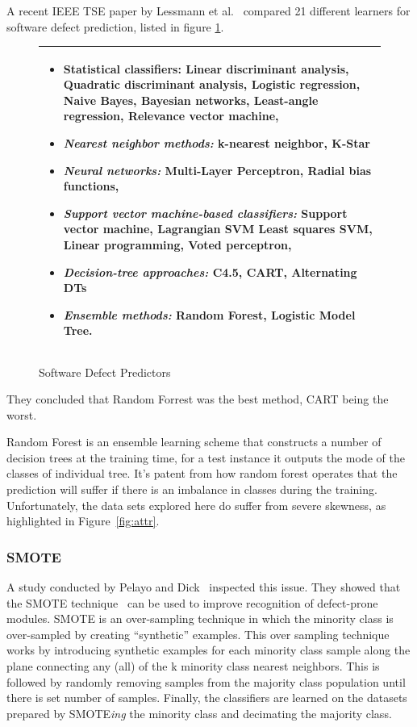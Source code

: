 \documentclass[10pt, journal, compsoc]{IEEEtran}
\begin{document}
A recent IEEE TSE paper by Lessmann et al.~\cite{lessmann} compared 21 different learners for software defect prediction, listed in figure \ref{fig:lessmann}.

\begin{figure}[htbp!]
  \begin{tabular}{|p{\linewidth}|}\hline
\begin{itemize}
\item Statistical classifiers:
Linear    discriminant analysis,
Quadratic discriminant analysis,
Logistic regression,
Naive Bayes,
Bayesian networks,
Least-angle regression,
Relevance vector machine,

\item \textit{Nearest neighbor methods:} k-nearest neighbor, K-Star

\item {\em Neural networks:} Multi-Layer Perceptron, Radial bias functions,

\item \textit{Support vector machine-based classifiers:}
Support vector machine,
Lagrangian SVM
Least squares SVM,
Linear programming,
Voted perceptron,

\item \textit{Decision-tree approaches:}
C4.5,
CART,
Alternating DTs
\item \textit{Ensemble methods:}
\textbf{Random Forest},
Logistic Model Tree.
\end{itemize}\\\hline
\end{tabular}
\caption{Software Defect Predictors}\label{fig:lessmann}
\end{figure}


They concluded that Random Forrest was the best method, CART being the worst.

Random Forest is an ensemble learning scheme that constructs a number of decision trees at the training time, for a test instance it outputs the mode of the classes of individual tree. It's patent from how random forest operates that the prediction will suffer if there is an imbalance in classes during the training. Unfortunately, the data sets explored here do suffer from severe skewness, as highlighted in Figure~\ref{fig:attr}. 

\subsubsection*{\Large{SMOTE}}
A study conducted by Pelayo and Dick~\cite{smote2} inspected this issue. They showed that the SMOTE technique~\cite{smote} can be used to improve recognition of defect-prone modules. SMOTE is an over-sampling technique in which the minority class is over-sampled by creating “synthetic” examples. This over sampling technique works by introducing synthetic examples for each minority class sample along the plane connecting any (all) of the k minority class nearest neighbors. This is followed by randomly removing samples from the majority class population until there is set number of samples. Finally, the classifiers are learned on the datasets prepared by SMOTE\textit{ing} the minority class and decimating the majority class.
\end{document}
